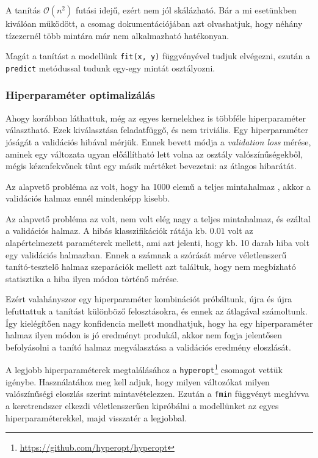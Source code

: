 \noindent
A tanítás $ \mathcal{O}(n^2) $ futási idejű, ezért nem jól skálázható. Bár a mi 
esetünkben kiválóan működött, a csomag dokumentációjában azt olvashatjuk, hogy néhány tízezernél
több mintára már nem alkalmazható hatékonyan.


Magát a tanítást a modellünk \texttt{fit(x, y)} függvényével tudjuk elvégezni, ezután 
a \texttt{predict} metódussal tudunk egy-egy mintát osztályozni.



\subsubsection{Hiperparaméter optimalizálás}
\label{sec:svm.hiperparameter.optimalizalas}

Ahogy korábban láthattuk, még az egyes kernelekhez is többféle hiperparaméter választható. Ezek kiválasztása
feladatfüggő, és nem triviális. Egy hiperparaméter jóságát a validációs hibával mérjük. Ennek 
bevett módja a \textit{validation loss} mérése, aminek egy változata ugyan előállítható lett volna 
az osztály valószínűségekből, mégis kézenfekvőnek tűnt egy másik mértéket bevezetni: az átlagos hibarátát.

Az alapvető probléma az volt, hogy ha 1000 elemű a teljes mintahalmaz , akkor a validációs 
halmaz ennél mindenképp kisebb. 

Az alapvető probléma az volt, nem volt elég nagy a teljes mintahalmaz, és ezáltal a validációs halmaz.
A hibás klasszifikációk rátája kb. $ 0.01 $ volt az alapértelmezett paraméterek mellett, ami azt
jelenti, hogy kb. 10 darab hiba volt egy validációs halmazban. Ennek a számnak a szórását mérve véletlenszerű
tanító-tesztelő halmaz szeparációk mellett azt találtuk, hogy nem megbízható statisztika a 
hiba ilyen módon történő mérése.

Ezért valahányszor egy hiperparaméter kombinációt próbáltunk, újra és újra lefuttattuk a
tanítást különböző felosztásokra, és ennek az átlagával számoltunk. Így kielégítően nagy 
konfidencia mellett mondhatjuk, hogy ha egy hiperparaméter halmaz ilyen módon is jó eredményt
produkál, akkor nem fogja jelentősen befolyásolni a tanító halmaz megválasztása a validációs 
eredmény eloszlását.

A legjobb hiperparaméterek megtalálásához a \texttt{hyperopt}\footnote{\url{https://github.com/hyperopt/hyperopt}} csomagot vettük
igénybe. Használatához meg kell adjuk, hogy milyen változókat milyen valószínűségi eloszlás szerint
mintavételezzen. Ezután a \texttt{fmin} függvényt meghívva a keretrendszer elkezdi véletlenszerűen
kipróbálni a modellünket az egyes hiperparaméterekkel, majd visszatér a legjobbal. 

